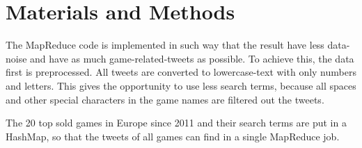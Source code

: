 \section{Materials and Methods}
The MapReduce code is implemented in such way that the result have less data-noise and have as much game-related-tweets as possible. To achieve this, the data first is preprocessed. All tweets are converted to lowercase-text with only numbers and letters. This gives the opportunity to use less search terms, because all spaces and other special characters in the game names are filtered out the tweets. 


The 20 top sold games in Europe since 2011 and their search terms are put in a HashMap, so that the tweets of all games can find in a single MapReduce job.
  